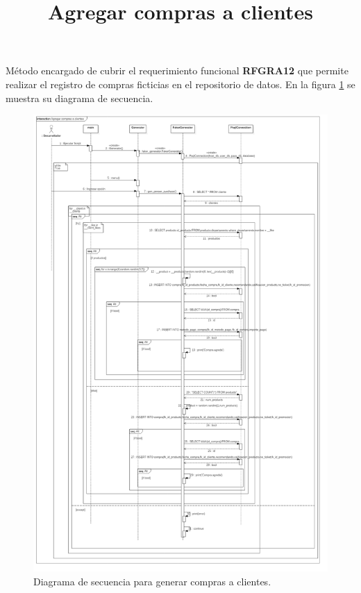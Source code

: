 \title{\textbf{Agregar compras a clientes\\}}
Método encargado de cubrir el requerimiento funcional \textbf{RFGRA12} que permite realizar el registro de compras ficticias en el repositorio de datos. En la figura \ref{image:DSgenerarCompra} se muestra su diagrama de secuencia. 
\FloatBarrier
\begin{figure}[htbp!]
		\centering
			\includegraphics[width=.83 \textwidth]{imagenes/DSRuben/comprasproductos}
		\caption{Diagrama de secuencia para generar compras a clientes.}
		\label{image:DSgenerarCompra}
\end{figure}
\FloatBarrier

